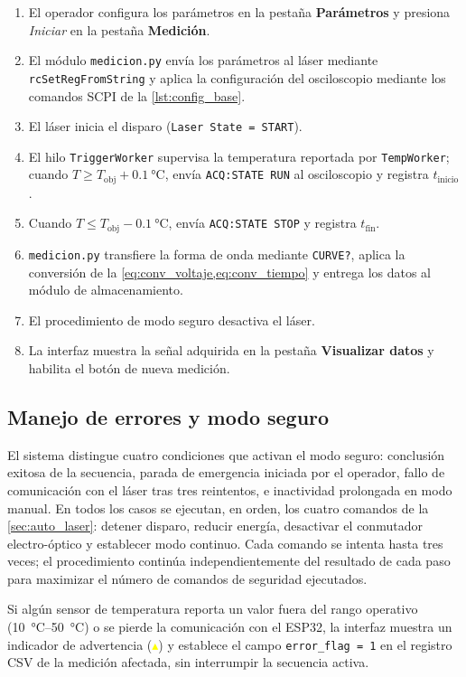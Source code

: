 \begin{enumerate}
    \item El operador configura los parámetros en la pestaña
    \textbf{Parámetros} y presiona \textit{Iniciar} en la pestaña
    \textbf{Medición}.
    \item El módulo \texttt{medicion.py} envía los parámetros al
    láser mediante \texttt{rcSetRegFromString} y aplica la
    configuración del osciloscopio mediante los comandos SCPI
    de la \cref{lst:config_base}.
    \item El láser inicia el disparo (\texttt{Laser State = START}).
    \item El hilo \texttt{TriggerWorker} supervisa la temperatura
    reportada por \texttt{TempWorker}; cuando $T \geq T_\text{obj}
    + \SI{0.1}{\celsius}$, envía \texttt{ACQ:STATE RUN} al
    osciloscopio y registra $t_\text{inicio}$.
    \item Cuando $T \leq T_\text{obj} - \SI{0.1}{\celsius}$,
    envía \texttt{ACQ:STATE STOP} y registra $t_\text{fin}$.
    \item \texttt{medicion.py} transfiere la forma de onda
    mediante \texttt{CURVE?}, aplica la conversión de la
    \cref{eq:conv_voltaje,eq:conv_tiempo} y entrega los datos
    al módulo de almacenamiento.
    \item El procedimiento de modo seguro desactiva el láser.
    \item La interfaz muestra la señal adquirida en la pestaña
    \textbf{Visualizar datos} y habilita el botón de nueva medición.
\end{enumerate}

\subsection*{Manejo de errores y modo seguro}

El sistema distingue cuatro condiciones que activan el modo seguro:
conclusión exitosa de la secuencia, parada de emergencia iniciada
por el operador, fallo de comunicación con el láser tras tres
reintentos, e inactividad prolongada en modo manual. En todos los
casos se ejecutan, en orden, los cuatro comandos de la
\cref{sec:auto_laser}: detener disparo, reducir energía,
desactivar el conmutador electro-óptico y establecer modo continuo.
Cada comando se intenta hasta tres veces; el procedimiento continúa
independientemente del resultado de cada paso para maximizar el
número de comandos de seguridad ejecutados.

Si algún sensor de temperatura reporta un valor fuera del rango
operativo (\SIrange{10}{50}{\celsius}) o se pierde la comunicación
con el ESP32, la interfaz muestra un indicador de advertencia
(\textcolor{yellow}{$\blacktriangle$}) y establece el campo
\texttt{error\_flag = 1} en el registro CSV de la medición
afectada, sin interrumpir la secuencia activa.

